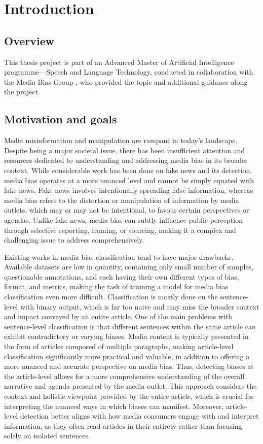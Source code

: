 \chapter{Introduction}
\label{cha:1}

\section{Overview}

This thesis project is part of an Advanced Master of Artificial Intelligence programme—Speech and Language Technology, conducted in collaboration with the Media Bias Group \cite{media-bias-group}, who provided the topic and additional guidance along the project.

\section{Motivation and goals}

Media misinformation and manipulation are rampant in today's landscape. Despite being a major societal issue, there has been insufficient attention and resources dedicated to understanding and addressing media bias in its broader context. While considerable work has been done on fake news and its detection, media bias operates at a more nuanced level and cannot be simply equated with fake news. Fake news involves intentionally spreading false information, whereas media bias refers to the distortion or manipulation of information by media outlets, which may or may not be intentional, to favour certain perspectives or agendas. Unlike fake news, media bias can subtly influence public perception through selective reporting, framing, or sourcing, making it a complex and challenging issue to address comprehensively.

Existing works in media bias classification tend to have major drawbacks. Available datasets are low in quantity, containing only small number of samples, questionable annotations, and each having their own different types of bias, format, and metrics, making the task of training a model for media bias classification even more difficult. Classification is mostly done on the sentence-level with binary output, which is far too naive and may miss the broader context and impact conveyed by an entire article. One of the main problems with sentence-level classification is that different sentences within the same article can exhibit contradictory or varying biases. Media content is typically presented in the form of articles composed of multiple paragraphs, making article-level classification significantly more practical and valuable, in addition to offering a more nuanced and accurate perspective on media bias. Thus, detecting biases at the article-level allows for a more comprehensive understanding of the overall narrative and agenda presented by the media outlet. This approach considers the context and holistic viewpoint provided by the entire article, which is crucial for interpreting the nuanced ways in which biases can manifest. Moreover, article-level detection better aligns with how media consumers engage with and interpret information, as they often read articles in their entirety rather than focusing solely on isolated sentences.

